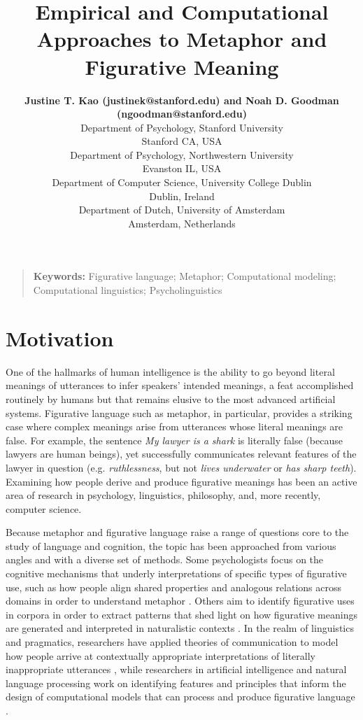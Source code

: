 \documentclass[10pt,letterpaper]{article}
\title{Empirical and Computational Approaches to Metaphor and Figurative Meaning}
\author{{\large \bf Justine T. Kao (justinek@stanford.edu) and Noah D. Goodman (ngoodman@stanford.edu)} \\ 
  Department of Psychology, 
  Stanford University \\ Stanford CA, USA 
  \AND {\large \bf Francisco Maravilla (fmaravil@gmail.com) and Dedre Gentner (gentner@northwestern.edu)} \\
  Department of Psychology, Northwestern University \\
  Evanston IL, USA
  \AND {\large \bf Tony Veale (tony.veale@ucd.ie)} \\
  Department of Computer Science, University College Dublin\\
  Dublin, Ireland
    \AND {\large \bf Gerard Steen (g.j.steen@uva.nl)} \\
  Department of Dutch, University of Amsterdam \\
Amsterdam, Netherlands
  }
\begin{document}
\maketitle

\begin{quote}
\small
\textbf{Keywords:} 
Figurative language; Metaphor; Computational modeling; Computational linguistics; Psycholinguistics
\end{quote}

\section{Motivation}
One of the hallmarks of human intelligence is the ability to go beyond literal meanings of utterances to infer speakers' intended meanings, a feat accomplished routinely by humans but that remains elusive to the most advanced artificial systems. Figurative language such as metaphor, in particular, provides a striking case where complex meanings arise from utterances whose literal meanings are false. For example, the sentence \emph{My lawyer is a shark} is literally false (because lawyers are human beings), yet successfully communicates relevant features of the lawyer in question (e.g. \emph{ruthlessness}, but not \emph{lives underwater} or \emph{has sharp teeth}). Examining how people derive and produce figurative meanings has been an active area of research in psychology, linguistics, philosophy, and, more recently, computer science. 


Because metaphor and figurative language raise a range of questions core to the study of language and cognition, the topic has been approached from various angles and with a diverse set of methods. Some psychologists focus on the cognitive mechanisms that underly interpretations of specific types of figurative use, such as how people align shared properties and analogous relations across domains in order to understand metaphor \cite{gentner1983structure, gentner2001metaphor}. 
Others aim to identify figurative uses in corpora in order to extract patterns that shed light on how figurative meanings are generated and interpreted in naturalistic contexts \cite{steen2010method}. In the realm of linguistics and pragmatics, researchers have applied theories of communication to model how people arrive at contextually appropriate interpretations of literally inappropriate utterances \cite{kao2014nonliteral, wilson2006metaphor, gibbs2012interpreting}, while researchers in artificial intelligence and natural language processing work on identifying features and principles that inform the design of computational models that can process and produce figurative language \cite{veale2000computation, veale2007comprehending}.
\end{document}
